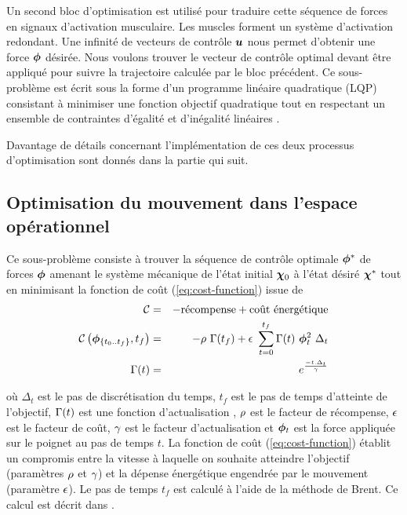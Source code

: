 \documentclass[pdftex,a4paper,11pt]{article}
\begin{document}
Un second bloc d'optimisation est utilisé pour traduire cette séquence de
forces en signaux d'activation musculaire.
Les muscles forment un système d'activation redondant. Une infinité de vecteurs
de contrôle $\boldsymbol{u}$ nous permet d'obtenir une force $\boldsymbol{\phi}$ désirée.  Nous
voulons trouver le vecteur de contrôle optimal devant être appliqué pour suivre
la trajectoire calculée par le bloc précédent. Ce sous-problème est écrit sous
la forme d'un programme linéaire quadratique (LQP) consistant à minimiser une
fonction objectif quadratique tout en respectant un ensemble de contraintes
d'égalité et d'inégalité linéaires \cite{salini10}.

Davantage de détails concernant l'implémentation de ces deux processus
d'optimisation sont donnés dans la partie qui suit.


\subsection{Optimisation du mouvement dans l'espace opérationnel}

Ce sous-problème consiste à trouver la séquence de contrôle optimale $\boldsymbol{\phi}^*$
de forces $\boldsymbol{\phi}$ amenant le système mécanique de l'état initial $\boldsymbol{\chi}_0$ à
l'état désiré $\boldsymbol{\chi}^*$ tout en minimisant la fonction de coût
(\ref{eq:cost-function}) issue de \cite{rigoux11}
%
%
\begin{eqnarray}
    \mathcal{C}                                          & = & - \text{récompense} + \text{coût énergétique} \label{eq:cost-function-sum}\\
    \mathcal{C}\left(\boldsymbol{\phi}_{\{t_0..t_f\}}, t_f\right)   & = & - \rho ~ \Gamma(t_f) + \epsilon ~ \sum^{t_f}_{t=0} \Gamma(t) ~ \boldsymbol{\phi}_t^2 ~ \Delta_t \label{eq:cost-function}\\
    \Gamma(t)                                  & = & e^{\frac{-t.\Delta_t}{\gamma}} \label{eq:discount-function}
\end{eqnarray}

où $\Delta_t$ est le pas de discrétisation du temps, $t_f$ est le pas de temps
d'atteinte de l'objectif, $\Gamma(t)$ est une fonction d'actualisation
, $\rho$ est le facteur de
récompense, $\epsilon$ est le facteur de coût, $\gamma$ est le
facteur d'actualisation et $\boldsymbol{\phi}_t$ est la force appliquée sur le poignet au
pas de temps $t$.
La fonction de coût (\ref{eq:cost-function}) établit un compromis entre la
vitesse à laquelle on souhaite atteindre l'objectif (paramètres
$\rho$ et $\gamma$) et la dépense énergétique engendrée par
le mouvement (paramètre $\epsilon$).
Le pas de temps $t_f$ est calculé à l'aide de la méthode de Brent.
Ce calcul est décrit dans \cite{rigoux11}.
\end{document}
